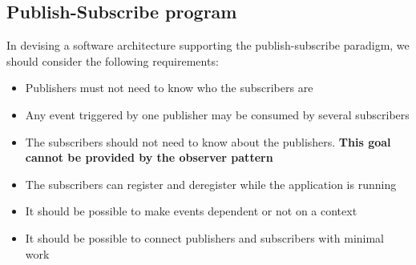 \documentclass[a4paper]{article}
\begin{document}
\subsection{Publish-Subscribe program}
In devising a software architecture supporting the publish-subscribe paradigm, we should consider the following requirements:
\begin{itemize}
\item Publishers must not need to know who the subscribers are
\item Any event triggered by one publisher may be consumed by several subscribers
\item The subscribers should not need to know about the publishers. \textbf{This goal cannot be provided by the observer pattern}
\item The subscribers can register and deregister while the application is running
\item It should be possible to make events dependent or not on a context
\item It should be possible to connect publishers and subscribers with minimal work
\end{itemize}
\end{document}
